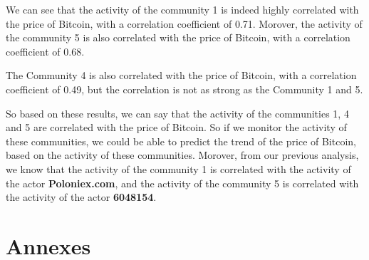 \documentclass[a4paper, 12pt]{article}
\begin{document}
\begin{table}[!h]
    \begin{minipage}{0.35\linewidth}
        \centering
        \label{tab:louvain_correlation_matrix_btc}
        \caption{Correlation BTC / Community}
    \end{minipage}%
    \hspace{0.05\linewidth} %
    \begin{minipage}{0.60\linewidth}
        We can see that the activity of the community 1 is indeed highly correlated with the price of Bitcoin,
        with a correlation coefficient of 0.71. Morover, the activity of the community 5 is also correlated with the price of Bitcoin,
        with a correlation coefficient of 0.68.

        The Community 4 is also correlated with the price of Bitcoin, with a correlation coefficient of 0.49, but the correlation is not as strong as the Community 1 and 5. \\
    \end{minipage}
\end{table}

So based on these results, we can say that the activity of the communities 1, 4 and 5 are correlated with the price of Bitcoin. 
So if we monitor the activity of these communities, we could be able to predict the trend of the price of Bitcoin, 
based on the activity of these communities. Morover, from our previous analysis, 
we know that the activity of the community 1 is correlated with the activity of the actor \textbf{Poloniex.com}, 
and the activity of the community 5 is correlated with the activity of the actor \textbf{6048154}. 


\newpage

\section{Annexes}
\end{document}
